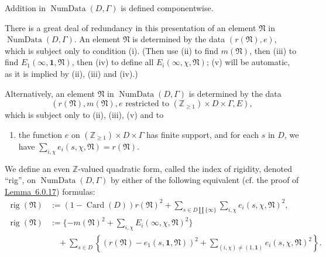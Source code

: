 Addition in \(\operatorname{NumData}(D,\Gamma)\) is defined componentwise.

There is a great deal of redundancy in this presentation of an element \(\mathfrak{N}\) in \(\operatorname{NumData}(D,\Gamma)\). An element \(\mathfrak{N}\) is determined by the data \((r(\mathfrak{N}),e)\), which is subject only to condition (i). (Then use (ii) to find \(m(\mathfrak{N})\), then (iii) to find \(E_1(\infty,\mathbf{1},\mathfrak{N})\), then (iv) to define all \(E_i(\infty,\chi,\mathfrak{N})\); (v) will be automatic, as it is implied by (ii), (iii) and (iv).)

Alternatively, an element \(\mathfrak{N}\) in \(\operatorname{NumData}(D,\Gamma)\) is determined by the data
\[
(r(\mathfrak{N}),m(\mathfrak{N}),e\text{ restricted to }(\mathbb{Z}_{\geq 1})\times D\times\Gamma,E),
\]
which is subject only to (ii), (iii), (v) and to
\begin{enumerate}[label={(\roman* not \(\infty\))}, widest={(i not \(\infty\))}, leftmargin=*]
\item the function \(e\) on \((\mathbb{Z}_{\geq 1})\times D\times\Gamma\) has finite support, and for each \(s\) in \(D\), we have \(\sum_{i,\chi}e_i(s,\chi,\mathfrak{N})=r(\mathfrak{N})\).
\end{enumerate}

We define an even \(\mathbb{Z}\)-valued quadratic form, called the index of rigidity, denoted ``rig'', on \(\operatorname{NumData}(D,\Gamma)\) by either of the following equivalent (\(\mathrm{cf.}\) the proof of \hyperref[lem:6.0.17]{Lemma~6.0.17}) formulas:
\[
\begin{aligned}
\operatorname{rig}(\mathfrak{N})&:=(1-\operatorname{Card}(D))r(\mathfrak{N})^2
+\sum_{s\in D\amalg\{\infty\}}\sum_{i,\chi}e_i(s,\chi,\mathfrak{N})^2,\\
\operatorname{rig}(\mathfrak{N})&:=\{-m(\mathfrak{N})^2+\sum_{i,\chi}E_i(\infty,\chi,\mathfrak{N})^2\}\\
&\quad+\sum_{s\in D}\left\{(r(\mathfrak{N})-e_1(s,\mathbf{1},\mathfrak{N}))^2
+\sum_{(i,\chi)\ne(1,\mathbf{1})}e_i(s,\chi,\mathfrak{N})^2\right\}.
\end{aligned}
\]

